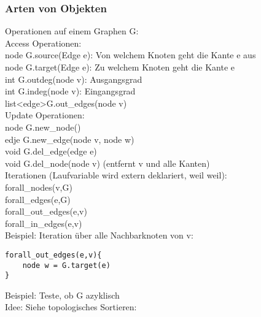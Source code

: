 \documentclass[a4paper]{article}
\begin{document}
\subsubsection*{Arten von Objekten}
Operationen auf einem Graphen G:\\
Access Operationen:\\
\hspace*{1cm}node G.source(Edge e): Von welchem Knoten geht die Kante e aus\\
\hspace*{1cm}node G.target(Edge e): Zu welchem Knoten geht die Kante e\\
\hspace*{1cm}int G.outdeg(node v): Ausgangsgrad\\
\hspace*{1cm}int G.indeg(node v): Eingangsgrad\\
\hspace*{1cm}list\textless edge\textgreater G.out\_edges(node v)\\
Update Operationen:\\
\hspace*{1cm}node G.new\_node()\\
\hspace*{1cm}edje G.new\_edge(node v, node w)\\
\hspace*{1cm}void G.del\_edge(edge e)\\
\hspace*{1cm}void G.del\_node(node v) (entfernt v und alle Kanten)\\
Iterationen (Laufvariable wird extern deklariert, weil weil):\\
\hspace*{1cm}forall\_nodes(v,G)\\
\hspace*{1cm}forall\_edges(e,G)\\
\hspace*{1cm}forall\_out\_edges(e,v)\\
\hspace*{1cm}forall\_in\_edges(e,v)\\
Beispiel: Iteration über alle Nachbarknoten von v:\\
\begin{lstlisting}
forall_out_edges(e,v){
	node w = G.target(e)
}
\end{lstlisting}
Beispiel: Teste, ob G azyklisch\\
Idee: Siehe topologisches Sortieren: \\
\end{document}
